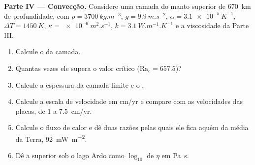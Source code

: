 \begin{problem}
\medskip\noindent\textbf{Parte IV --- Convecção.} Considere uma camada do manto superior
de \qty{670}{km} de profundidade, com $\rho = \qty{3700}{kg.m^{-3}}$, $g =
\qty{9.9}{m.s^{-2}}$, $\alpha = \qty{3.1e-5}{K^{-1}}$, $\Delta T =
\qty{1450}{K}$, $\kappa = \qty{e-6}{m^2.s^{-1}}$, $k = \qty{3.1}{W.m^{-1}.K^{-1}}$
e a viscosidade da Parte III.
\begin{enumerate}[resume]
  \item Calcule o  da camada.
  \item Quantas vezes ele supera o valor crítico ($\mathrm{Ra}_c = 657.5$)?
  \item Calcule a espessura da camada limite e o .
  \item Calcule a escala de velocidade em \unit{cm/yr} e compare com as velocidades
        das placas, de 1 a \qty{7.5}{cm/yr}.
  \item Calcule o fluxo de calor e dê duas razões pelas quais ele fica aquém da
        média da Terra, \qty{92}{mW.m^{-2}}.
  \item Dê a  superior sob o lago Ardo como $\log_{10}$ de
        $\eta$ em \unit{Pa.s}.
\end{enumerate}
\end{problem}
